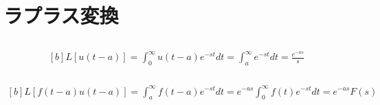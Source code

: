 \documentclass[../ap_2011.tex]{subfiles}
\begin{document}
\setcounter{chapter}{4}
\chapter{ラプラス変換}
\section{}
\subsection{}
\begin{equation}\begin{aligned}[b]
    L[u(t-a)]=\int_{0}^{\infty}u(t-a)e^{-st}dt
    = \int_{a}^{\infty} e^{-st}dt = \frac{e^{-as}}{s}
\end{aligned}\end{equation}

\subsection{}
\begin{equation}\begin{aligned}[b]
    L[f(t-a)u(t-a)]=\int_{a}^{\infty}f(t-a)e^{-st}dt = e^{-as}\int_{0}^{\infty}f(t)e^{-st} dt = e^{-as}F(s)
\end{aligned}\end{equation}
\end{document}
